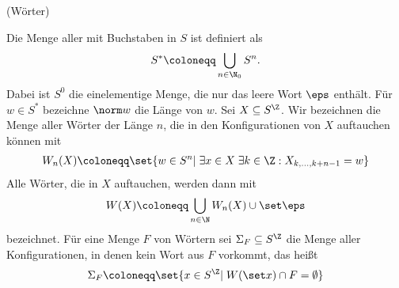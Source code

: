 \begin{definition} (Wörter)

Die Menge aller  mit Buchstaben in $S$ ist definiert als
\begin{align*}
  S^* \coloneqq \bigcup_{n \in \N_0} S^n.
\end{align*}
  Dabei ist $S^0$ die einelementige Menge, die nur das leere Wort $\eps$ enthält. Für $w \in S^*$ bezeichne $\norm w$ die Länge von $w$. Sei $X \subseteq S^\Z$. Wir bezeichnen die Menge aller Wörter der Länge $n$, die in den Konfigurationen von $X$ auftauchen können mit
  \begin{align*}
 W_n(X) \coloneqq \set{w \in S^n| \; \exists x \in X \;\exists k \in \Z: X_{k, \dots, k+n-1} = w}   
  \end{align*}
Alle Wörter, die in $X$ auftauchen, werden dann mit 
\begin{align*}
  W(X) \coloneqq \bigcup_{n \in \N} W_n(X) \cup \set \eps
\end{align*}
 bezeichnet. Für eine Menge $F$ von Wörtern sei $\Sigma_F \subseteq S^\Z$ die Menge aller Konfigurationen, in denen kein Wort aus $F$ vorkommt, das heißt 
 \begin{align*}
   \Sigma_F \coloneqq \set{x \in S^\Z |\; W(\set x) \cap F = \emptyset}
 \end{align*}
\end{definition}
